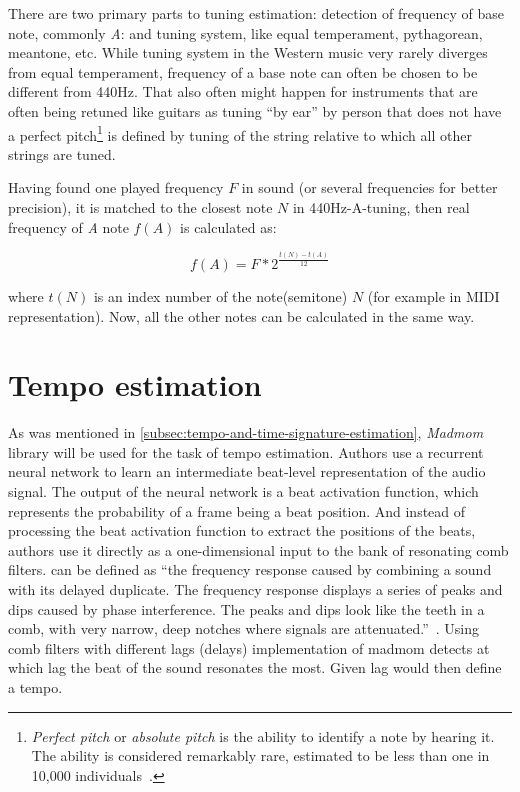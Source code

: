 There are two primary parts to tuning estimation: detection of frequency of base note, commonly \textit{A}:
and tuning system, like equal temperament, pythagorean, meantone, etc. While tuning system in the Western music very
rarely diverges from equal temperament, frequency of a base note can often be chosen to be different from 440Hz. That
also often might happen for instruments that are often being retuned like guitars as tuning ``by ear'' by person that
does not have a perfect pitch\footnote{\textit{Perfect pitch} or \textit{absolute pitch} is the ability to identify
a note by hearing it. The ability is considered remarkably rare, estimated to be less than one in 10,000
individuals~\cite{perfect-pitch}.} is defined by tuning of the string relative to which all other strings are tuned.

Having found one played frequency $F$ in sound (or several frequencies for better precision), it is matched to
the closest note $N$ in 440Hz-A-tuning, then real frequency of \textit{A} note $f(A)$ is calculated as:

\[ f(A) = F * 2^\frac{t(N)-t(A)}{12} \]

where $t(N)$ is an index number of the note(semitone) $N$ (for example in \ac{MIDI} representation). Now, all the other
notes can be calculated in the same way.

\section{Tempo estimation}\label{sec:tempo-estimation}
As was mentioned in \cref{subsec:tempo-and-time-signature-estimation}, \textit{Madmom} library will be used for
the task of tempo estimation. Authors use a recurrent neural network to learn an intermediate beat-level representation
of the audio signal. The output of the neural network is a beat activation function, which represents the probability of
a frame being a beat position. And instead of processing the beat activation function to extract the positions of
the beats, authors use it directly as a one-dimensional input to the bank of resonating comb filters.  can be defined as ``the frequency response caused by combining a sound with its delayed duplicate.
The frequency response displays a series of peaks and dips caused by phase interference. The peaks and dips look like
the teeth in a comb, with very narrow, deep notches where signals are attenuated.''~\cite{comb-filter}. Using comb
filters with different lags (delays) implementation of madmom detects at which lag the beat of the sound resonates
the most. Given lag would then define a tempo.

